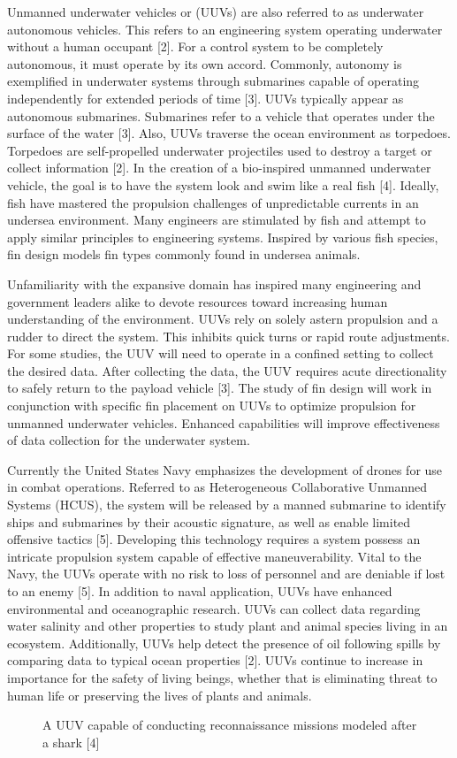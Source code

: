 \documentclass{IEEEtran}
\begin{document}
Unmanned underwater vehicles or (UUVs) are also referred to as underwater autonomous vehicles.  This refers to an engineering system operating underwater without a human occupant [2].  For a control system to be completely autonomous, it must operate by its own accord.  Commonly, autonomy is exemplified in underwater systems through submarines capable of operating independently for extended periods of time [3].  UUVs typically appear as autonomous submarines.  Submarines refer to a vehicle that operates under the surface of the water [3].  Also, UUVs traverse the ocean environment as torpedoes.  Torpedoes are self-propelled underwater projectiles used to destroy a target or collect information [2].  In the creation of a bio-inspired unmanned underwater vehicle, the goal is to have the system look and swim like a real fish [4].  Ideally, fish have mastered the propulsion challenges of unpredictable currents in an undersea environment.  Many engineers are stimulated by fish and attempt to apply similar principles to engineering systems.  Inspired by various fish species, fin design models fin types commonly found in undersea animals.  

Unfamiliarity with the expansive domain has inspired many engineering and government leaders alike to devote resources toward increasing human understanding of the environment.  UUVs rely on solely astern propulsion and a rudder to direct the system.  This inhibits quick turns or rapid route adjustments.  For some studies, the UUV will need to operate in a confined setting to collect the desired data.  After collecting the data, the UUV requires acute directionality to safely return to the payload vehicle [3].  The study of fin design will work in conjunction with specific fin placement on UUVs to optimize propulsion for unmanned underwater vehicles.  Enhanced capabilities will improve effectiveness of data collection for the underwater system.  
   
Currently the United States Navy emphasizes the development of drones for use in combat operations.  Referred to as Heterogeneous Collaborative Unmanned Systems (HCUS), the system will be released by a manned submarine to identify ships and submarines by their acoustic signature, as well as enable limited offensive tactics [5].  Developing this technology requires a system possess an intricate propulsion system capable of effective maneuverability.  Vital to the Navy, the UUVs operate with no risk to loss of personnel and are deniable if lost to an enemy [5].  In addition to naval application, UUVs have enhanced environmental and oceanographic research.  UUVs can collect data regarding water salinity and other properties to study plant and animal species living in an ecosystem.  Additionally, UUVs help detect the presence of oil following spills by comparing data to typical ocean properties [2].  UUVs continue to increase in importance for the safety of living beings, whether that is eliminating threat to human life or preserving the lives of plants and animals.    
\begin{figure}
\caption{A UUV capable of conducting reconnaissance missions modeled after a shark [4]}
\label{fig:1}
\end{figure}
\end{document}
